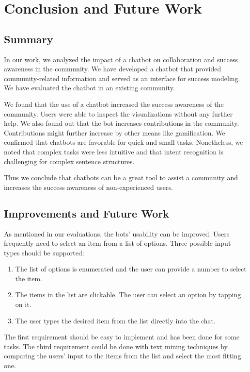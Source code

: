 \chapter{Conclusion and Future Work}

\section{Summary}
In our work, we analyzed the impact of a chatbot on collaboration and success awareness in the community. We have developed a chatbot that provided community-related information and served as an interface for success modeling.  We have evaluated the chatbot in an existing community.

We found that the use of a chatbot increased the success awareness of the community. Users were able to inspect the visualizations without any further help.
We also found out that the bot increases contributions in the community. Contributions might further increase by other means like gamification. 
We confirmed that chatbots are favorable for quick and small tasks. Nonetheless, we noted that complex tasks were less intuitive and that intent recognition is challenging for complex sentence structures.

Thus we conclude that chatbots can be a great tool to assist a community and increases the success awareness of non-experienced users.  


\section{Improvements and Future Work}
As mentioned in our evaluations, the bots' usability can be improved.
Users frequently need to select an item from a list of options. Three possible input types should be supported:
\begin{enumerate}
    \item The list of options is enumerated and the user can provide a number to select the item.
    \item The items in the list are clickable. The user can select an option by tapping on it. 
    \item The user types the desired item from the list directly into the chat. 
\end{enumerate}
The first requirement should be easy to implement and has been done for some tasks.
The third requirement could be done with text mining techniques by comparing the users' input to the items from the list and select the most fitting one.

